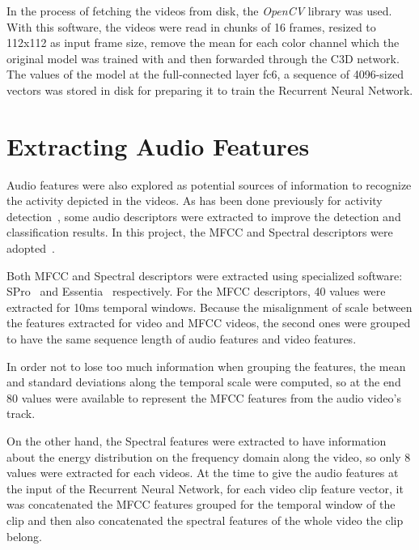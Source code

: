 
In the process of fetching the videos from disk, the \textit{OpenCV}\cite{opencv_library} library was used. With this software, the videos were read in chunks of 16 frames, resized to 112x112 as input frame size, remove the mean for each color channel which the original model was trained with and then forwarded through the C3D network. The values of the model at the full-connected layer fc6, a sequence of 4096-sized vectors was stored in disk for preparing it to train the Recurrent Neural Network. %

\section{Extracting Audio Features}

Audio features were also explored as potential sources of information to recognize the activity depicted in the videos. As has been done previously for activity detection~\cite{xu2015uts}, some audio descriptors were extracted to improve the detection and classification results. In this project, the MFCC and Spectral descriptors were adopted~\cite{heittola2013context}. 

Both MFCC and Spectral descriptors were extracted using specialized software: SPro~\cite{gravier2010spro} and Essentia~\cite{bogdanov2013essentia} respectively. For the MFCC descriptors, 40 values were extracted for 10ms temporal windows. Because the misalignment of scale between the features extracted for video and MFCC videos, the second ones were grouped to have the same sequence length of audio features and video features. 

In order not to lose too much information when grouping the features, the mean and standard deviations along the temporal scale were computed, so at the end 80 values were available to represent the MFCC features from the audio video's track.

On the other hand, the Spectral features were extracted to have information about the energy distribution on the frequency domain along the video, so only 8 values were extracted for each videos. At the time to give the audio features at the input of the Recurrent Neural Network, for each video clip feature vector, it was concatenated the MFCC features grouped for the temporal window of the clip and then also concatenated the spectral features of the whole video the clip belong. 

